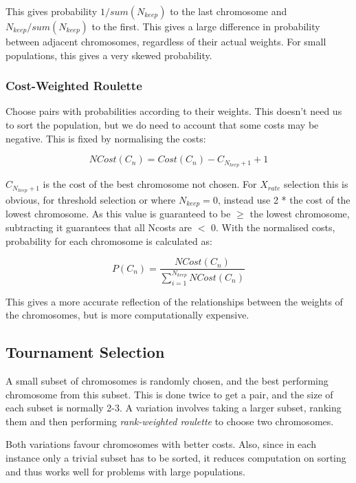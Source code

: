 This gives probability \(1/sum(N_{keep})\) to the last chromosome and \(N_{keep}/sum(N_{keep})\) to the first. This gives a large difference in probability between adjacent chromosomes, regardless of their actual weights. For small populations, this gives a very skewed probability.

\subsubsection{Cost-Weighted Roulette}
Choose pairs with probabilities according to their weights. This doesn't need us to sort the population, but we do need to account that some costs may be negative. This is fixed by normalising the costs:

\begin{equation}
    NCost(C_n) = Cost(C_n) - C_{N_{keep}+1} +1
\end{equation}

 $C_{N_{keep}+1}$ is the cost of the best chromosome not chosen. For $X_{rate}$ selection this is obvious, for threshold selection or where $N_{keep} = 0$, instead use 2 * the cost of the lowest chromosome. As this value is guaranteed to be $\geq$ the lowest chromosome, subtracting it guarantees that all Ncosts are $<$ 0. With the normalised costs, probability for each chromosome is calculated as:
 
\begin{equation}
    P(C_n) = \frac{NCost(C_n)}{\sum_{i=1}^{N_{keep}} NCost(C_n)}
\end{equation} 

This gives a more accurate reflection of the relationships between the weights of the chromosomes, but is more computationally expensive. 

\subsection{Tournament Selection}
A small subset of chromosomes is randomly chosen, and the best performing chromosome from this subset. This is done twice to get a pair, and the size of each subset is normally 2-3. A variation involves taking a larger subset, ranking them and then performing \emph{rank-weighted roulette} to choose two chromosomes.

Both variations favour chromosomes with better costs. Also, since in each instance only a trivial subset has to be sorted, it reduces computation on sorting and thus works well for problems with large populations. 